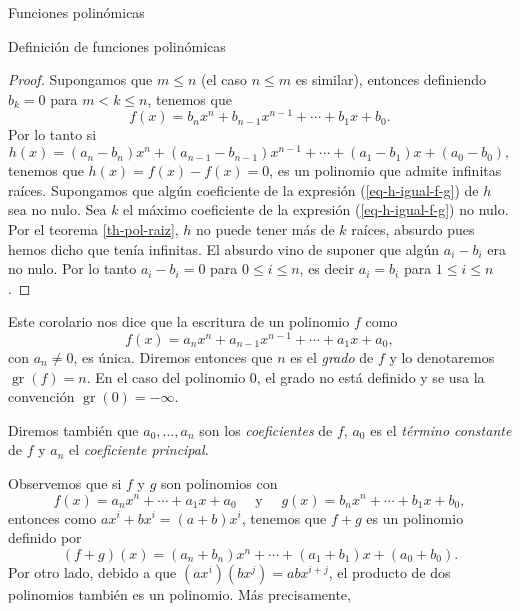 \documentclass[a4paper,12pt,twoside,spanish,reqno]{amsbook}
\numberwithin{equation}{section}
\theoremstyle{definition}
\theoremstyle{remark}
\begin{document}
\begin{chapter}{Funciones polinómicas}
\begin{section}{Definición de funciones polinómicas}
\begin{proof}
        Supongamos que $m \le n$ (el caso $n \le m$ es similar), entonces definiendo $b_k=0$ para $m < k \le n$, tenemos que
        \begin{equation*}
        f(x) = b_nx^n + b_{n-1}x^{n-1}+\cdots + b_1x +b_0.
        \end{equation*}
        Por lo tanto si 
        \begin{equation}\label{eq-h-igual-f-g}
            h(x) = (a_n- b_n)x^n + (a_{n-1}-b_{n-1})x^{n-1}+\cdots + (a_{1}-b_{1})x +(a_{0}-b_{0}), 
        \end{equation}
        tenemos  que $h(x)= f(x)-f(x)=0$,  es un polinomio que admite infinitas raíces. 
        Supongamos  que algún coeficiente de la expresión (\ref{eq-h-igual-f-g}) de $h$ sea no nulo. Sea $k$  el máximo coeficiente de la expresión (\ref{eq-h-igual-f-g}) no nulo. Por el teorema   \ref{th-pol-raiz}, $h$ no  puede tener más de $k$ raíces, absurdo pues hemos dicho que tenía infinitas. El absurdo vino de suponer que algún $a_i-b_i$ era no nulo. Por lo tanto $a_i -b_i=0$ para $0 \le i \le n$,  es decir $a_i=b_i$ para $1 \le i \le n$. 
        
        
    \end{proof}

    Este corolario nos dice que la escritura de un polinomio $f$ como 
    \begin{equation*}
    f(x) = a_nx^n + a_{n-1}x^{n-1}+\cdots + a_1x +a_0,
    \end{equation*}
    con $a_n \ne 0$, es única. Diremos entonces que $n$ es el  \textit{grado} de $f$ y lo denotaremos $\operatorname{gr}(f)=n$. En  el caso del polinomio 0, el grado no está definido y se usa la convención $\operatorname{gr}(0)=-\infty$. 
    
    Diremos también que  $a_0,\ldots,a_n$ son los \textit{coeficientes} de $f$, $a_0$ es el \textit{término constante} de $f$ y $a_n$  el \textit{coeficiente principal.} 

    Observemos que si $f$ y $g$ son polinomios con   
    \begin{equation*}
    f(x) = a_nx^n + \cdots + a_1x +a_0 \quad\text{ y } \quad g(x) = b_nx^n +\cdots + b_1x +b_0,
    \end{equation*}
    entonces como $ax^i + b x^i = (a+b)x^i$, tenemos que $f+g$ es un polinomio definido por 
    \begin{equation*}
    (f + g)(x) = (a_n+b_n)x^n + \cdots + (a_1+b_1)x +(a_0+b_0).
    \end{equation*}
    Por otro  lado,  debido  a que $(ax^i)(bx^j) = abx^{i+j}$, el producto de dos polinomios también es un polinomio. Más precisamente,
    

\end{section}
\end{chapter}
\end{document}

